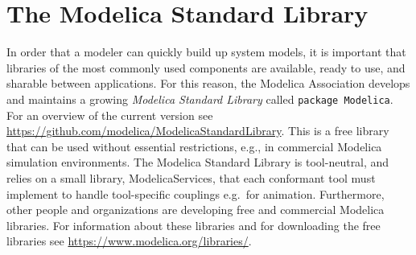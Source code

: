 \chapter{The Modelica Standard Library}\label{the-modelica-standard-library}

In order that a modeler can quickly build up system models, it is
important that libraries of the most commonly used components are
available, ready to use, and sharable between applications. For this
reason, the Modelica Association develops and maintains a growing
\emph{Modelica Standard Library} called \lstinline!package Modelica!. For an
overview of the current version see
\url{https://github.com/modelica/ModelicaStandardLibrary}.
This is a free library that can be used without essential restrictions, e.g., in
commercial Modelica simulation environments. The Modelica Standard
Library is tool-neutral, and relies on a small library,
ModelicaServices, that each conformant tool must implement to handle
tool-specific couplings e.g.\ for animation. Furthermore, other people
and organizations are developing free and commercial Modelica libraries.
For information about these libraries and for downloading the free
libraries see \url{https://www.modelica.org/libraries/}.
